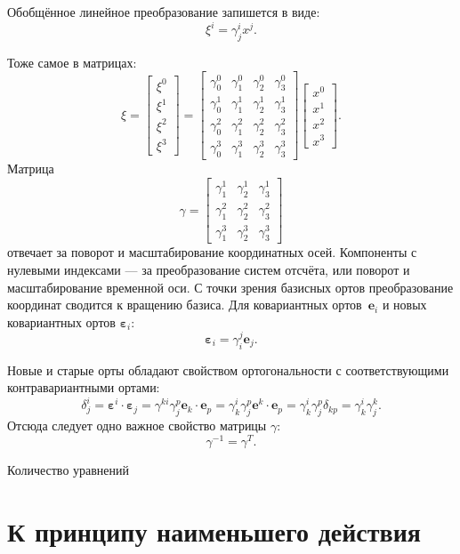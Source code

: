 \documentclass[a4paper,14pt]{extreport} %
\renewcommand{\vec}[1]{\boldsymbol{#1}}
\newcommand{\eps}{\varepsilon}
\begin{document}
	Обобщённое линейное преобразование запишется в виде:
	\[
		\xi^i = \gamma_{j}^{i} x^j.
	\]
	
	Тоже самое в матрицах:
	\[
		\xi = 
		\begin{bmatrix}
			\xi^0 \\
			\xi^1 \\
			\xi^2 \\
			\xi^3 
		\end{bmatrix}
		=
		\begin{bmatrix}
			\gamma^0_0 & \gamma^0_1 & \gamma^0_2 & \gamma^0_3 \\
			\gamma^1_0 & \gamma^1_1 & \gamma^1_2 & \gamma^1_3 \\
			\gamma^2_0 & \gamma^2_1 & \gamma^2_2 & \gamma^2_3 \\
			\gamma^3_0 & \gamma^3_1 & \gamma^3_2 & \gamma^3_3 
		\end{bmatrix}
		\begin{bmatrix}
			x^0 \\
			x^1 \\
			x^2 \\
			x^3 
		\end{bmatrix}.
	\]
	Матрица 
	\[
		\gamma = 
		\begin{bmatrix}
		\gamma^1_1 & \gamma^1_2 & \gamma^1_3 \\
		\gamma^2_1 & \gamma^2_2 & \gamma^2_3 \\
		\gamma^3_1 & \gamma^3_2 & \gamma^3_3 
		\end{bmatrix}
	\]
	отвечает за поворот и масштабирование координатных осей. Компоненты с нулевыми индексами --- за преобразование систем отсчёта, или поворот и масштабирование временной оси. С точки зрения базисных ортов преобразование координат сводится к вращению базиса. Для ковариантных ортов~$\vec{e}_i$ и новых ковариантных ортов $\vec{\eps}_i$:
	\[
		\vec{\eps}_i = \gamma^j_i\vec{e}_j.
	\]
	
	Новые и старые орты обладают свойством ортогональности с соответствующими контравариантными ортами:
	\[
		\delta_j^i = 
		\vec{\eps}^i\cdot\vec{\eps}_j = 
		\gamma^{ki} \gamma^p_j \vec{e}_k\cdot\vec{e}_p = 
		\gamma^i_k \gamma^p_j \vec{e}^k\cdot\vec{e}_p = 
		\gamma^i_k \gamma^p_j \delta_{kp} =
		\gamma^i_k \gamma^k_j.
	\]
	Отсюда следует одно важное свойство матрицы $\gamma$:
	\[
		\gamma^{-1} = \gamma^T.
	\]
	
	Количество уравнений 
	
	\chapter{К принципу наименьшего действия}
	
\end{document}
